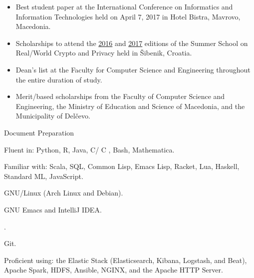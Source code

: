 \documentclass[version=last, paper=A4, DIV=12, toc=bibliography]{scrartcl}%
\newcommand*{\CC}{%
  C\nolinebreak%
  \hspace{-.05em}\raisebox{.4ex}{\relsize{-3}{\textbf{+}}}\nolinebreak%
  \hspace{-.10em}\raisebox{.4ex}{\relsize{-3}{\textbf{+}}}%
}%
\begin{document}
\begin{itemize}
\item Best student paper at the  International Conference on Informatics
  and Information Technologies held on April 7, 2017 in Hotel Bistra,
  Mavrovo, Macedonia.
\item Scholarships to attend the
  \href{http://summerschool-croatia.cs.ru.nl/2016/}{2016} and
  \href{http://summerschool-croatia.cs.ru.nl/2017/}{2017} editions of the Summer
  School on Real\-/World Crypto and Privacy held in Šibenik, Croatia.
\item Dean's list at the \textsf{Faculty for Computer Science and Engineering}
  throughout the entire duration of study.
\item Merit\-/based scholarships from the \textsf{Faculty of Computer Science
    and Engineering}, the \textsf{Ministry of Education and Science of
    Macedonia}, and the \textsf{Municipality of Delčevo}.
\end{itemize}


\begingroup
{}
\begin{labeling}[~--]{Document Preparation}
\item[Programming] Fluent in: Python, R, Java, C/\CC, Bash,
  Mathematica\textsuperscript{\textregistered}.

  Familiar with: Scala, SQL, Common Lisp, Emacs Lisp, Racket, Lua, Haskell,
  Standard ML, JavaScript.
\item[Operating Systems] GNU/Linux (Arch Linux and Debian).
\item[Text Editors/IDEs] GNU Emacs and IntelliJ IDEA\@.
\item[Document Preparation] .
\item[Version Control] Git.
\item[Miscellaneous] Proficient using: the Elastic Stack (Elasticsearch, Kibana,
  Logstash, and Beat), Apache Spark, HDFS, Ansible, NGINX, and the Apache HTTP
  Server.
\end{labeling}
\endgroup

\printbibliography[title=Publications]
\end{document}
